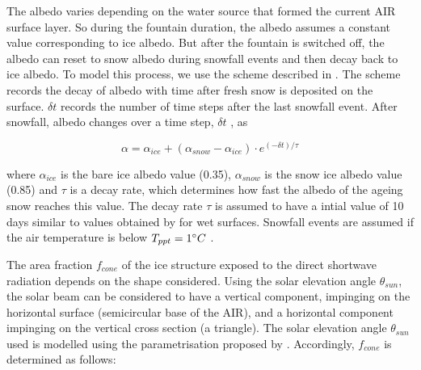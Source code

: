 \documentclass[utf8]{frontiersSCNS} %
\begin{document}
The albedo varies depending on the water source that formed the current AIR surface layer. So during the fountain
duration, the albedo assumes a constant value corresponding to ice albedo. But after the fountain is switched off, the
albedo can reset to snow albedo during snowfall events and then decay back to ice albedo. To model this process, we use
the scheme described in \cite{OerlemansKnap_1998}. The scheme records the decay of albedo with time after fresh snow is
deposited on the surface. $\delta t$ records the number of time steps after the last snowfall event. After snowfall,
albedo changes over a time step, $\delta t$ , as

\begin{equation} \alpha=\alpha_{ice}+(\alpha_{snow}-\alpha_{ice}) \cdot e^{(-\delta t)/\tau} \label{eqn:a}
\end{equation}

where $\alpha_{ice}$ is the bare ice albedo value (0.35), $\alpha_{snow}$ is the snow ice albedo value (0.85) and $\tau$
is a decay rate, which determines how fast the albedo of the ageing snow reaches this value.  The decay rate $\tau$ is
assumed to have a intial value of 10 days similar to values obtained by \cite{Schmidt_2017} for wet surfaces. Snowfall
events are assumed if the air temperature is below $T_{ppt}=1 \degree C$ \citep{FujitaAgeta_2000}.

The area fraction $f_{cone}$ of the ice structure exposed to the direct shortwave radiation depends on the shape
considered. Using the solar elevation angle $\theta_{sun}$,  the solar beam can be considered to have a vertical
component, impinging on the horizontal surface (semicircular base of the AIR), and a horizontal component impinging on
the vertical cross section (a triangle). The solar elevation angle $\theta_{sun}$ used is modelled using the
parametrisation proposed by \cite{Woolf_1968}. Accordingly, $f_{cone}$ is determined as follows:

\end{document}
